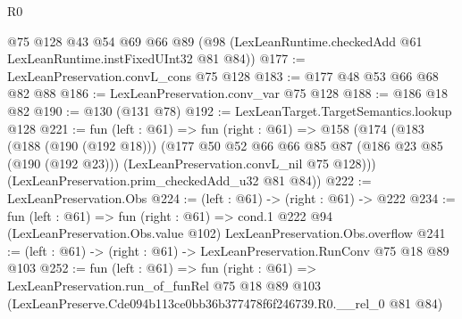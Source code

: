 \begin{lexlean}{R0}
\begin{coremodule}
    @75
    @128
    @43
    @54
    @69
    @66
    @89
    (@98 (LexLeanRuntime.checkedAdd @61 LexLeanRuntime.instFixedUInt32 @81 @84))
@177 := LexLeanPreservation.convL_cons @75 @128
@183 := @177 @48 @53 @66 @68 @82 @88
@186 := LexLeanPreservation.conv_var @75 @128
@188 := @186 @18 @82
@190 := @130 (@131 @78)
@192 := LexLeanTarget.TargetSemantics.lookup @128
@221 := fun (left : @61) =>
  fun (right : @61) =>
  @158
    (@174
      (@183
        (@188 (@190 (@192 @18)))
        (@177
          @50
          @52
          @66
          @66
          @85
          @87
          (@186 @23 @85 (@190 (@192 @23)))
          (LexLeanPreservation.convL_nil @75 @128)))
      (LexLeanPreservation.prim_checkedAdd_u32 @81 @84))
@222 := LexLeanPreservation.Obs
@224 := (left : @61) -> (right : @61) -> @222
@234 := fun (left : @61) =>
  fun (right : @61) =>
  cond.{1} @222 @94 (LexLeanPreservation.Obs.value @102) LexLeanPreservation.Obs.overflow
@241 := (left : @61) -> (right : @61) -> LexLeanPreservation.RunConv @75 @18 @89 @103
@252 := fun (left : @61) =>
  fun (right : @61) =>
  LexLeanPreservation.run_of_funRel
    @75
    @18
    @89
    @103
    (LexLeanPreserve.Cde094b113ce0bb36b377478f6f246739.R0.__rel_0 @81 @84)
\end{coremodule}
\end{lexlean}
